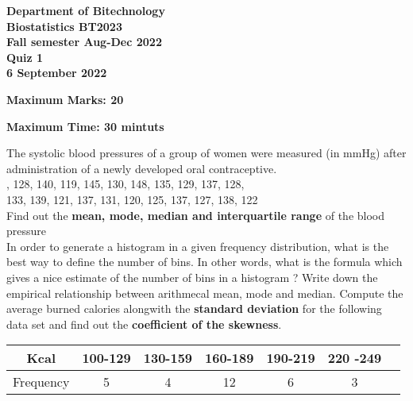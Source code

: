 \documentclass{exam}
\begin{document}
\begin{center}
  \bfseries\large
  Department of Bitechnology\\
  Biostatistics  BT2023\\
  Fall semester Aug-Dec 2022\\
  Quiz 1\\
  6 September 2022

\begin{flushright} \textbf{Maximum Marks: 20} \end{flushright} 

  \bigskip
{}
\end{center}
\begin{flushleft} \textbf{Maximum Time: 30 mintuts} \end{flushleft}  
\vspace{5mm}

\begin{questions}
	\question The systolic blood pressures of a group of women were measured (in mmHg) after administration of a newly developed oral contraceptive.\\
, 128, 140, 119, 145, 130, 148, 135, 129, 137, 128, \\
133, 139, 121, 137, 131, 120, 125, 137, 127, 138, 122 \\

Find out the \textbf{mean, mode, median and interquartile range} of the blood pressure\\
\question In order to generate a histogram in a given frequency distribution, what is the best way to define the number of bins. In other words, what is the formula which gives a nice estimate of the number of bins in a histogram ?
\question Write down the empirical relationship between arithmecal mean, mode and median. 
\question Compute the average burned calories alongwith the \textbf{standard deviation} for the following data set and  find out the \textbf{coefficient of the skewness}.\\
\newline
\begin{tabular}{ |c|c|c|c|c|c|c| } 
 \hline
 Kcal & 100-129 & 130-159 & 160-189 & 190-219 & 220 -249 \\ 
\hline
 Frequency & 5 & 4 & 12 & 6 & 3 \\ 
 \hline
\end{tabular}
\end{questions}
\end{document}
